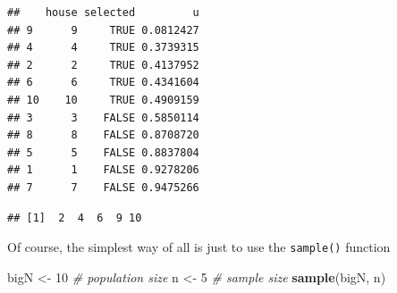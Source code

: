 \documentclass[
]{book}
\newenvironment{Shaded}{\begin{snugshade}}{\end{snugshade}}
\newcommand{\AttributeTok}[1]{\textcolor[rgb]{0.13,0.29,0.53}{#1}}
\newcommand{\CommentTok}[1]{\textcolor[rgb]{0.56,0.35,0.01}{\textit{#1}}}
\newcommand{\ConstantTok}[1]{\textcolor[rgb]{0.56,0.35,0.01}{#1}}
\newcommand{\DecValTok}[1]{\textcolor[rgb]{0.00,0.00,0.81}{#1}}
\newcommand{\FunctionTok}[1]{\textcolor[rgb]{0.13,0.29,0.53}{\textbf{#1}}}
\newcommand{\NormalTok}[1]{#1}
\newcommand{\OtherTok}[1]{\textcolor[rgb]{0.56,0.35,0.01}{#1}}
\newcommand{\SpecialCharTok}[1]{\textcolor[rgb]{0.81,0.36,0.00}{\textbf{#1}}}
\begin{document}
\begin{Shaded}
\end{Shaded}

\begin{verbatim}
##    house selected         u
## 9      9     TRUE 0.0812427
## 4      4     TRUE 0.3739315
## 2      2     TRUE 0.4137952
## 6      6     TRUE 0.4341604
## 10    10     TRUE 0.4909159
## 3      3    FALSE 0.5850114
## 8      8    FALSE 0.8708720
## 5      5    FALSE 0.8837804
## 1      1    FALSE 0.9278206
## 7      7    FALSE 0.9475266
\end{verbatim}

\begin{Shaded}
\end{Shaded}

\begin{verbatim}
## [1]  2  4  6  9 10
\end{verbatim}

Of course, the simplest way of all is just to use the \texttt{sample()} function

\begin{Shaded}
\begin{Highlighting}[]
\NormalTok{bigN }\OtherTok{\textless{}{-}} \DecValTok{10} \CommentTok{\# population size}
\NormalTok{n }\OtherTok{\textless{}{-}} \DecValTok{5}  \CommentTok{\# sample size}
\FunctionTok{sample}\NormalTok{(bigN, n)}
\end{Highlighting}
\end{Shaded}
\end{document}
